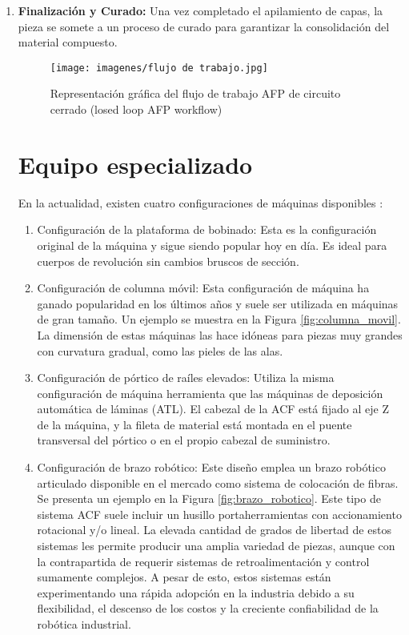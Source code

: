 \begin{enumerate}[label=\arabic*.]
    \item \textbf{Finalización y Curado:}
        Una vez completado el apilamiento de capas, la pieza se somete a un proceso de curado para garantizar la consolidación del material compuesto.

\begin{figure}[h]
    \centering
    \texttt{[image: imagenes/flujo de trabajo.jpg]}
    \caption{Representación gráfica del flujo de trabajo AFP de circuito cerrado (losed loop AFP workflow)}
    \label{fig:enter-label}
\end{figure}


        
\section{Equipo especializado}

En la actualidad, existen cuatro configuraciones de máquinas disponibles \cite{crosky2012}:
\begin{enumerate}
  \item Configuración de la plataforma de bobinado: Esta es la configuración original de la máquina y sigue siendo popular hoy en día. Es ideal para cuerpos de revolución sin cambios bruscos de sección.
  \item Configuración de columna móvil: Esta configuración de máquina ha ganado popularidad en los últimos años y suele ser utilizada en máquinas de gran tamaño. Un ejemplo se muestra en la Figura \ref{fig:columna_movil}. La dimensión de estas máquinas las hace idóneas para piezas muy grandes con curvatura gradual, como las pieles de las alas.
  \item Configuración de pórtico de raíles elevados: Utiliza la misma configuración de máquina herramienta que las máquinas de deposición automática de láminas (ATL). El cabezal de la ACF está fijado al eje Z de la máquina, y la fileta de material está montada en el puente transversal del pórtico o en el propio cabezal de suministro.
  \item Configuración de brazo robótico: Este diseño emplea un brazo robótico articulado disponible en el mercado como sistema de colocación de fibras. Se presenta un ejemplo en la Figura \ref{fig:brazo_robotico}. Este tipo de sistema ACF suele incluir un husillo portaherramientas con accionamiento rotacional y/o lineal. La elevada cantidad de grados de libertad de estos sistemas les permite producir una amplia variedad de piezas, aunque con la contrapartida de requerir sistemas de retroalimentación y control sumamente complejos. A pesar de esto, estos sistemas están experimentando una rápida adopción en la industria debido a su flexibilidad, el descenso de los costos y la creciente confiabilidad de la robótica industrial.
\end{enumerate}


\end{enumerate}
